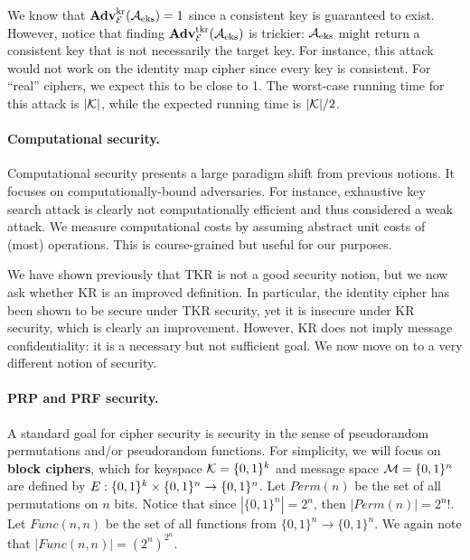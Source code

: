 We know that $\mathbf{Adv}^{\mathrm{kr}}_{{\cal E}}({\mathcal A}_{\textnormal{eks}}) = 1$ since a consistent key is guaranteed to exist. However, notice that finding $\mathbf{Adv}^{\mathrm{tkr}}_{{\cal E}}({\mathcal A}_{\textnormal{eks}})$ is trickier: ${\mathcal A}_{\textnormal{eks}}$ might return a consistent key that is not necessarily the target key. For instance, this attack would not work on the identity map cipher since every key is consistent. For ``real'' ciphers, we expect this to be close to 1. 
The worst-case running time for this attack is $|{\cal K}|$, while the expected running time is $|{\cal K}|/2$.

\paragraph{Computational security.} Computational security presents a large paradigm shift from previous notions. It focuses on computationally-bound adversaries. For instance, exhaustive key search attack is clearly not computationally efficient and thus considered a weak attack. We measure computational costs by assuming abstract unit costs of (most) operations. This is course-grained but useful for our purposes. 

We have shown previously that TKR is not a good security notion, but we now ask whether KR is an improved definition. In particular, the identity cipher has been shown to be secure under TKR security, yet it is insecure under KR security, which is clearly an improvement. However, KR does not imply message confidentiality: it is a necessary but not sufficient goal. We now move on to a very different notion of security.

\paragraph{PRP and PRF security.} A standard goal for cipher security is security in the sense of pseudorandom permutations and/or pseudorandom functions. For simplicity, we will focus on \textbf{block ciphers}, which for keyspace ${\cal K}=\{0,1\}^k$ and message space ${\cal M}=\{0,1\}^n$ are defined by $E : \{0,1\}^k \times \{0,1\}^n \to \{0,1\}^n$. Let $Perm(n)$ be the set of all permutations on $n$ bits. Notice that since $|\{0,1\}^n| = 2^n$, then $|Perm(n)| = 2^n!$. Let $Func(n,n)$ be the set of all functions from $\{0,1\}^n \to \{0,1\}^n$. We again note that $|Func(n,n)| = (2^n)^{2^n}$.

